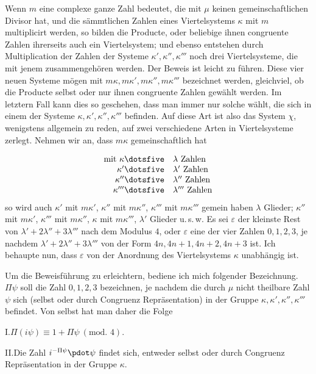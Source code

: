 Wenn $m$ eine complexe ganze Zahl bedeutet, die mit $\mu$ keinen gemeinschaftlichen Divisor hat, und die sämmtlichen Zahlen eines Viertelsystems $\kappa$ mit $m$ multiplicirt werden, so bilden die Producte, oder beliebige ihnen congruente Zahlen ihrerseits auch ein Viertelsystem; und ebenso entstehen durch Multiplication der Zahlen der Systeme $\kappa',\kappa'',\kappa'''$ noch drei Viertelsysteme, die mit jenem zusammengehören werden. Der Beweis ist leicht zu führen. Diese vier neuen Systeme mögen mit $m\kappa,m\kappa',m\kappa'',m\kappa'''$ bezeichnet werden, gleichviel, ob die Producte selbst oder nur ihnen congruente Zahlen gewählt werden. Im letztern Fall kann dies so geschehen, dass man immer nur solche wählt, die sich in einem der Systeme $\kappa,\kappa',\kappa'',\kappa'''$ befinden. Auf diese Art ist also das System $\chi$, wenigstens allgemein zu reden, auf zwei verschiedene Arten in Viertelsysteme zerlegt. Nehmen wir an, dass $m\kappa$ gemeinschaftlich hat

\[
\begin{array}{rl}
\text{mit }\kappa\dotsfive&\lambda\text{ Zahlen}\\
\kappa'\dotsfive&\lambda'\text{ Zahlen}\\
\kappa''\dotsfive&\lambda''\text{ Zahlen}\\
\kappa'''\dotsfive&\lambda'''\text{ Zahlen}
\end{array}
\]
so wird auch $\kappa'$ mit $m\kappa'$, $\kappa''$ mit $m\kappa''$, $\kappa'''$ mit $m\kappa'''$ gemein haben $\lambda$ Glieder;
$\kappa''$ mit $m\kappa'$, $\kappa'''$ mit $m\kappa''$, $\kappa$ mit $m\kappa'''$, $\lambda'$ Glieder u.\,s.\,w. Es sei $\varepsilon$ der kleinste Rest von $\lambda'+2\lambda''+3\lambda'''$ nach dem Modulus $4$, oder $\varepsilon$ eine der vier Zahlen $0,1,2,3$, je nachdem $\lambda'+2\lambda''+3\lambda'''$ von der Form $4n,4n+1,4n+2,4n+3$ ist. Ich behaupte nun, dass $\varepsilon$ von der Anordnung des Viertelsystems $\kappa$ unabhängig ist.

Um die Beweisführung zu erleichtern, bediene ich mich folgender Bezeichnung. $\Pi\psi$ soll die Zahl $0,1,2,3$ bezeichnen, je nachdem die durch $\mu$ nicht theilbare Zahl $\psi$ sich (selbst oder durch Congruenz Repräsentation) in der Gruppe $\kappa,\kappa',\kappa'',\kappa'''$ befindet. Von selbst hat man daher die Folge

I.\quad $\Pi(i\psi)\equiv1+\Pi\psi\ (\text{mod. }4)$.

II.\quad Die Zahl $i^{-\Pi\psi}\pdot\psi$ findet sich, entweder selbst oder durch Congruenz Repräsentation in der Gruppe $\kappa$.

